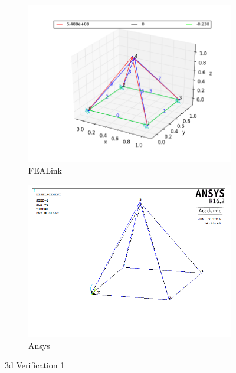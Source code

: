 \documentclass[11pt, oneside]{article}   	%
\begin{document}
\begin{figure}[h]
\centering
  \begin{subfigure}[b]{0.45\textwidth}
    \includegraphics[width=\textwidth]{Verification/FEALink/3dVerification1.png}
    \caption{FEALink}
    \label{fig:3dV1FEALink}
  \end{subfigure}
  \begin{subfigure}[b]{0.45\textwidth}
    \includegraphics[width=\textwidth]{Verification/Ansys/3dVerification1.png}
    \caption{Ansys}
    \label{fig:3dV1Ansys}
  \end{subfigure}
\caption{3d Verification 1}
\label{fig:3dVerification1}%
\end{figure}
\end{document}
